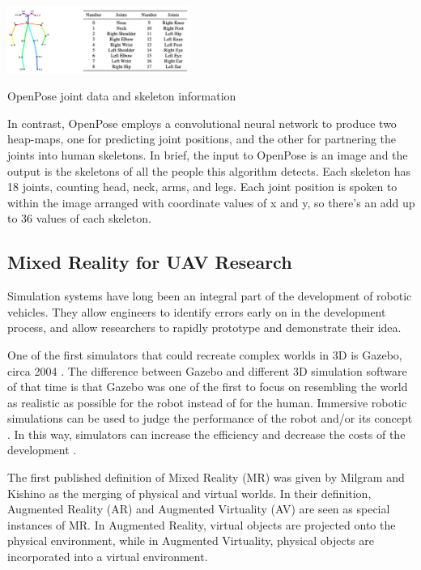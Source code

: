 \begin{marginfigure}%
    \includegraphics[width=6cm]{images/openpose.png}
    \caption{OpenPose joint data and skeleton information}
\end{marginfigure}

In contrast, OpenPose  \cite{liu_szirányi_2021} employs a convolutional neural network to produce two heap-maps, one for predicting joint positions, and the other for partnering the joints into human skeletons. In brief, the input to OpenPose is an image and the output is the skeletons of all the people this algorithm detects. Each skeleton has 18 joints, counting head, neck, arms, and legs. Each joint position is spoken to within the image arranged with coordinate values of x and y, so there’s an add up to 36 values of each skeleton.

\subsection{Mixed Reality for UAV Research}

Simulation systems have long been an integral part of the development of robotic vehicles. They allow engineers to identify errors early on in the development process, and allow researchers to rapidly prototype and demonstrate their idea.

One of the first simulators that could recreate complex worlds in 3D is Gazebo, circa 2004 \cite{simulator_history}. The difference between Gazebo and different 3D simulation software of that time is that Gazebo was one of the first to focus on resembling the world as realistic as possible for the robot instead of for the human. Immersive robotic simulations can be used to judge the performance of the robot and/or its concept \cite{gcs_validation}. In this way, simulators can increase the efficiency and decrease the costs of the development \cite{simulator_history}. 

The first published definition of Mixed Reality (MR) was given by Milgram and Kishino \cite{mixed_reality} as the merging of physical and virtual worlds. In their definition, Augmented Reality (AR) and Augmented Virtuality (AV) are seen as special instances of MR. In Augmented Reality, virtual objects are projected onto the physical environment, while in Augmented Virtuality, physical objects are incorporated into a virtual environment. 

